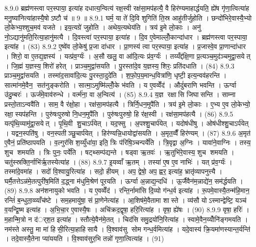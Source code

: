 8.9.0
ब्रह्म॑णस्त्वा पर॒स्पाया॒ इत्या॑ह दधात्य॒न्वित्य॑ रक्ष॒स्वी रक्ष॑सा॒मप॑हत्यै॒ वै हिर॑ण्यमाहार्द्धयति॒ ह्ये॑ष गृ॑णा॒त्वित्या॑ह मनु॒ष्या॑नित्या॑हास्यै॒षोऽष्टौ च॑ ॥ 9 ॥
8.9.1
घर्म॒ या ते॑ दि॒वि शुगिति॑ ति॒स्र आहु॑तीर्जुहोति । छन्दो॑भिरे॒वास्यै॒भ्यो लो॒केभ्य॒श्शुच॒मव॑ यजते । इय॒त्यग्रे॑ जुहोति । अथेय॒त्यथेय॑ति । त्रय॑ इ॒मे लो॒काः । अनु॑ नो॒ऽद्यानु॑मति॒रित्या॒हानु॑मत्यै । दि॒वस्त्वा॑ पर॒स्पाया॒ इत्या॑ह । दि॒व ए॒वेमाल्लोँ॒कान्दा॑धार । ब्रह्म॑णस्त्वा पर॒स्पाया॒ इत्या॑ह । (83)
8.9.2
ए॒ष्वे॑व लो॒केषु॑ प्र॒जा दा॑धार । प्रा॒णस्य॑ त्वा पर॒स्पाया॒ इत्या॑ह । प्र॒जास्वे॒व प्रा॒णान्दा॑धार । शिरो॒ वा ए॒तद्य॒ज्ञस्य॑ । यत्प्र॑व॒र्ग्यः॑ । अ॒सौ खलु॒ वा आ॑दि॒त्यः प्र॑व॒र्ग्यः॑ । तय्यँद्द॑क्षि॒णा प्र॒त्यञ्च॒मुद॑ञ्चमुद्वा॒सयेत् । जि॒ह्मं य॒ज्ञस्य॒ शिरो॑ हरेत् । प्राञ्च॒मुद्वा॑सयति । पु॒रस्ता॑दे॒व य॒ज्ञस्य॒ शिरः॒ प्रति॑दधाति । (84)
8.9.3
प्राञ्च॒मुद्वा॑सयति । तस्मा॑द॒सावा॑दि॒त्यः पु॒रस्ता॒दुदे॑ति । श॒फो॒प॒य॒मान्ध॒वित्रा॑णि॒ धृष्टी॒ इत्य॒न्वव॑हरन्ति । सात्मा॑नमे॒वैन॒ सत॑नुङ्करोति । सात्मा॒ऽमुष्मि॑ल्लोँ॒के भ॑वति । य ए॒वव्वेँद॑ । औदुं॑बराणि भवन्ति । ऊर्ग्वा उ॑दु॒म्बरः॑ । ऊर्ज॑मे॒वाव॑रुन्धे । वर्त्म॑ना॒ वा अ॒न्वित्य॑ । (85)
8.9.4
य॒ज्ञ रक्षासि जिघासन्ति । साम्ना प्रस्तो॒ताऽन्ववै॑ति । साम॒ वै र॑क्षो॒हा । रक्ष॑सा॒मप॑हत्यै । त्रिर्नि॒धन॒मुपै॑ति । त्रय॑ इ॒मे लो॒काः । ए॒भ्य ए॒व लो॒केभ्यो॒ रक्षा॒स्यप॑हन्ति । पुरु॑षःपुरुषो नि॒धन॒मुपै॑ति । पुरु॑षःपुरुषो॒ हि र॑क्ष॒स्वी । रक्ष॑सा॒मप॑हत्यै । (86)
8.9.5
यत्पृ॑थि॒व्यामु॑द्वा॒सयेत् । पृ॒थि॒वी शु॒चाऽर्प॑येत् । यद॒फ्सु । अ॒पश्शु॒चार्प॑येत् । यदोष॑धीषु । ओष॑धीश्शु॒चाऽर्प॑येत् । यद्वन॒स्पति॑षु । वन॒स्पतीञ्छु॒चार्प॑येत् । हिर॑ण्यन्नि॒धायोद्वा॑सयति । अ॒मृत॒व्वैँ हिर॑ण्यम् । (87)
8.9.6
अ॒मृत॑ ए॒वैनं॒ प्रति॑ष्ठापयति । व॒ल्गुर॑सि श॒य्युँधा॑या॒ इति॒ त्रिः प॑रिषि॒ञ्चन्पर्ये॑ति । त्रि॒वृद्वा अ॒ग्निः । यावा॑ने॒वाग्निः । तस्य॒ शुच शमयति । त्रिः पुनः॒ पर्ये॑ति । षट्थ्सम्प॑द्यन्ते । षड्वा ऋ॒तवः॑ । ऋ॒तुभि॑रे॒वास्य॒ शुच शमयति । चतु॑स्स्रक्ति॒र्नाभि॑र्\mbox{}ऋ॒तस्येत्या॑ह । (88)
8.9.7
इ॒यव्वाँ ऋ॒तम् । तस्या॑ ए॒ष ए॒व नाभिः॑ । यत् प्र॑व॒र्ग्यः॑ । तस्मा॑दे॒वमा॑ह । सदो॑ वि॒श्वायु॒रित्या॑ह । सदो॒ हीयम् । अप॒ द्वेषो॒ अप॒ ह्वर॒ इत्या॑ह॒ भ्रातृ॑व्यापनुत्त्यै । घर्मै॒तत्तेऽन्न॑मे॒तत्पुरी॑ष॒मिति॑ द॒द्ध्ना म॑धुमि॒श्रेण॑ पूरयति । ऊर्ग्वा अ॒न्नाद्य॒न्दधि॑ । ऊ॒र्जैवैन॑म॒न्नाद्ये॑न॒ सम॑र्द्धयति । (89)
8.9.8
अन॑शनायुको भवति । य ए॒वव्वेँद॑ । रन्ति॒र्नामा॑सि दि॒व्यो ग॑न्ध॒र्व इत्या॑ह । रू॒पमे॒वास्यै॒तन्म॑हि॒मान॒ रन्तिं॑ ब॒न्धुता॒व्व्याँच॑ष्टे । सम॒हमायु॑षा॒ सं प्रा॒णेनेत्या॑ह । आ॒शिष॑मे॒वैतामा शास्ते । व्य॑सौ योऽस्मान्द्वेष्टि॒ यञ्च॑ व॒यन्द्वि॒ष्म इत्या॑ह । अ॒भि॒चा॒र ए॒वास्यै॒षः । अचि॑क्रद॒द्वृषा॒ हरि॒रित्या॑ह । वृषा॒ ह्ये॑षः । (90)
8.9.9
वृषा॒ हरिः॑ । म॒हान्मि॒त्रो न द॑र््श॒त इत्या॑ह । स्तौत्ये॒वैन॑मे॒तत् । चिद॑सि समु॒द्रयो॑नि॒रित्या॑ह । स्वामे॒वैन॒य्योँनि॑ङ्गमयति । नम॑स्ते अस्तु॒ मा मा॑ हिसी॒रित्या॒हाहिसायै । वि॒श्वाव॑सु सोम गन्ध॒र्वमित्या॑ह । यदे॒वास्य॑ क्रि॒यमा॑णस्यान्त॒र्यन्ति॑ । तदे॒वास्यै॒तेना प्या॑ययति । वि॒श्वाव॑सुर॒भि तन्नो॑ गृणा॒त्वित्या॑ह । (91)
